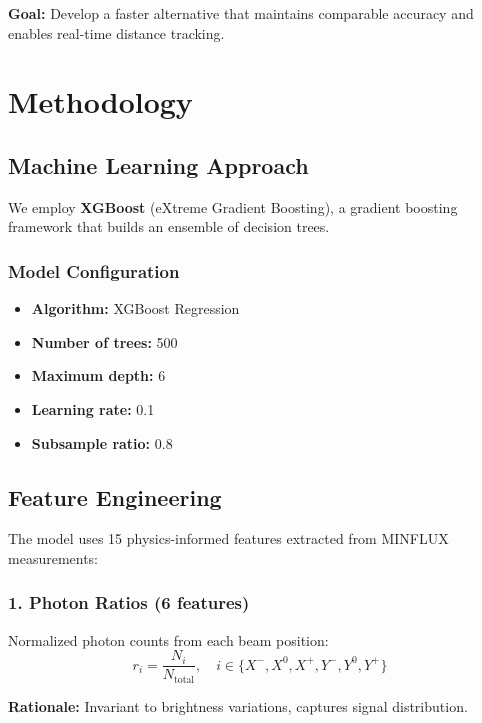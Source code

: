 \documentclass[a4paper,11pt]{article}
\begin{document}
\textbf{Goal:} Develop a faster alternative that maintains comparable accuracy and enables real-time distance tracking.

\section{Methodology}

\subsection{Machine Learning Approach}

We employ \textbf{XGBoost} (eXtreme Gradient Boosting), a gradient boosting framework that builds an ensemble of decision trees.

\subsubsection{Model Configuration}

\begin{itemize}[leftmargin=*]
    \item \textbf{Algorithm:} XGBoost Regression
    \item \textbf{Number of trees:} 500
    \item \textbf{Maximum depth:} 6
    \item \textbf{Learning rate:} 0.1
    \item \textbf{Subsample ratio:} 0.8
\end{itemize}

\subsection{Feature Engineering}

The model uses 15 physics-informed features extracted from MINFLUX measurements:

\subsubsection{1. Photon Ratios (6 features)}

Normalized photon counts from each beam position:
\begin{equation}
r_i = \frac{N_i}{N_{\text{total}}}, \quad i \in \{X^-, X^0, X^+, Y^-, Y^0, Y^+\}
\end{equation}

\textbf{Rationale:} Invariant to brightness variations, captures signal distribution.
\end{document}
